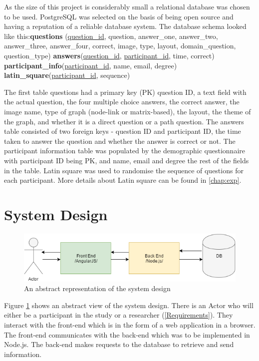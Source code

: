 \documentclass{l4proj}
\begin{document}
As the size of this project is considerably small a relational database was chosen to be used. PostgreSQL was selected on the basis of being open source and having a reputation of a reliable database system. The database schema looked like this:\newline \textbf{questions} (\underline{question\_id}, question, answer\_one, answer\_two, answer\_three,
		answer\_four, correct, image, type, layout, domain\_question, question\_type) \newline
\textbf{answers}(\underline{question\_id}, \underline{participant\_id}, time, correct) \newline
\textbf{participant\_info}(\underline{participant\_id}, name, email, degree) \newline
\textbf{latin\_square}(\underline{participant\_id}, sequence) \newline

The first table questions had a primary key (PK) question ID, a text field with the actual question, the four multiple choice answers, the correct answer, the image name, type of graph (node-link or matrix-based), the layout, the theme of the graph, and whether it is a direct question or a path question. The answers table consisted of two foreign keys - question ID and participant ID, the time taken to answer the question and whether the answer is correct or not. The participant information table was populated by the demographic questionnaire with participant ID being PK, and name, email and degree the rest of the fields in the table. Latin square was used to randomise the sequence of questions for each participant. More details about Latin square can be found in \autoref{chap:exp}.

\section{System Design}

\begin{figure}[H]
\centering
\includegraphics[width=11.5cm]{abstractDesign.png}
\caption{An abstract representation of the system design}
\label{abstractDesign}
\end{figure}


Figure \ref{abstractDesign} shows an abstract view of the system design. There is an Actor who will either be a participant in the study or a researcher (\autoref{Requirements}). They interact with the front-end which is in the form of a web application in a browser. The front-end communicates with the back-end which was to be implemented in Node.js. The back-end makes requests to the database to retrieve and send information. 
\end{document}
